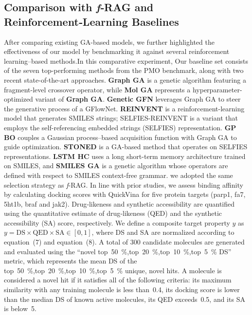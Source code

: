\documentclass[lettersize,journal]{IEEEtran}
\begin{document}
\subsection{Comparison with \textit{f}‑RAG\cite{lee2024molecule} and Reinforcement‑Learning Baselines}
After comparing existing GA-based models, we further highlighted the effectiveness of our model by benchmarking it against several reinforcement learning–based methods.In this comparative experiment, Our baseline set consists of the seven top-performing methods from the PMO benchmark, along with two recent state-of-the-art approaches. \textbf{Graph GA}  is a genetic algorithm featuring a fragment-level crossover operator, while \textbf{Mol GA}  represents a hyperparameter-optimized variant of \textbf{Graph GA}. \textbf{Genetic GFN}\cite{kim2024genetic}  leverages Graph GA to steer the generative process of a GFlowNet. \textbf{REINVENT}\cite{olivecronaMolecularDeNovoDesign2017} is a reinforcement-learning model that generates SMILES strings; SELFIES-REINVENT is a variant that employs the self-referencing embedded strings (SELFIES) representation. \textbf{GP BO} couples a Gaussian process–based acquisition function with Graph GA to guide optimization. \textbf{STONED} is a GA-based method that operates on SELFIES representations. \textbf{LSTM HC} uses a long short-term memory architecture trained on SMILES, and \textbf{SMILES GA}  is a genetic algorithm whose operators are defined with respect to SMILES context-free grammar.
we adopted the same selection strategy as \textit{f}‑RAG. In line with prior studies, we assess binding affinity by calculating docking scores with QuickVina for five protein targets (parp1, fa7, 5ht1b, braf and jak2). Drug‑likeness and synthetic accessibility are quantified using the quantitative estimate of drug‑likeness (QED) and the synthetic accessibility (SA) score, respectively. We define a composite target property \( y \) as \( y = \mathrm{DS} \times \mathrm{QED} \times \mathrm{SA} \in [0,1] \), where DS and SA are normalized according to equation~(7) and equation~(8). A total of 300 candidate molecules are generated and evaluated using the ``novel top~50~\%,top~20~\%,top~10~\%,top~5~\% DS'' metric, which represents the mean DS of the top~50~\%,top~20~\%,top~10~\%,top~5~\% unique, novel hits. A molecule is considered a novel hit if it satisfies all of the following criteria: its maximum similarity with any training molecule is less than~0.4, its docking score is lower than the median DS of known active molecules, its QED exceeds~0.5, and its SA is below~5.
\end{document}
